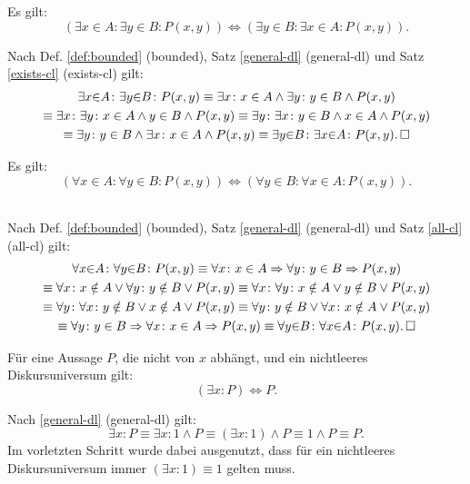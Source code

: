 \begin{Satz}\label{bounded-exists-cl}
Es gilt:
\[(\exists x{\in}A\colon \exists y{\in}B\colon P(x,y))
\iff (\exists y{\in}B\colon \exists x{\in}A\colon P(x,y)).\]
\end{Satz}

\begin{Beweis} Nach Def. \ref{def:bounded} (bounded),
Satz \ref{general-dl} (general-dl)
und Satz \ref{exists-cl} (exists-cl) gilt:
\begin{gather*}
\exists x{\in}A\colon \exists y{\in}B\colon P(x,y)
\equiv \exists x\colon x\in A\land\exists y\colon y\in B\land P(x,y)\\
\equiv \exists x\colon \exists y\colon x\in A\land y\in B\land P(x,y)
\equiv \exists y\colon \exists x\colon y\in B\land x\in A\land P(x,y)\\
\equiv \exists y\colon y\in B\land \exists x\colon x\in A\land P(x,y)
\equiv \exists y{\in}B\colon\exists x{\in}A\colon P(x,y).\,\square
\end{gather*}
\end{Beweis}

\begin{Satz}\label{bounded-all-cl}
Es gilt:
\[(\forall x{\in}A\colon \forall y{\in}B\colon P(x,y))
\iff (\forall y{\in}B\colon \forall x{\in}A\colon P(x,y)).\]
\end{Satz}
\begin{Beweis}\mbox{}\\
Nach Def. \ref{def:bounded} (bounded),
Satz \ref{general-dl} (general-dl)
und Satz \ref{all-cl} (all-cl) gilt:
\begin{gather*}
\forall x{\in}A\colon \forall y{\in}B\colon P(x,y)
\equiv \forall x\colon x\in A\Rightarrow \forall y\colon y\in B\Rightarrow P(x,y)\\
\equiv \forall x\colon x\notin A\lor \forall y\colon y\notin B\lor P(x,y)
\equiv \forall x\colon \forall y\colon x\notin A\lor y\notin B\lor P(x,y)\\
\equiv \forall y\colon \forall x\colon y\notin B\lor x\notin A\lor P(x,y)
\equiv \forall y\colon y\notin B\lor \forall x\colon x\notin A\lor P(x,y)\\
\equiv \forall y\colon y\in B\Rightarrow \forall x\colon x\in A\Rightarrow P(x,y)
\equiv \forall y{\in}B\colon\forall x{\in}A\colon P(x,y).\,\square
\end{gather*}
\end{Beweis}

\begin{Satz}
Für eine Aussage $P$, die nicht von $x$ abhängt, und ein nichtleeres
Diskursuniversum gilt:
\[(\exists x\colon P) \iff P.\]
\end{Satz}
\begin{Beweis}[Beweis]
Nach \ref{general-dl} (general-dl) gilt:
\[\exists x\colon P \equiv \exists x\colon 1\land P
\equiv (\exists x\colon 1)\land P\equiv 1\land P\equiv P.\]
Im vorletzten Schritt wurde dabei ausgenutzt, dass
für ein nichtleeres Diskursuniversum immer $(\exists x\colon 1)\equiv 1$
gelten muss.\,\qedsymbol
\end{Beweis}


